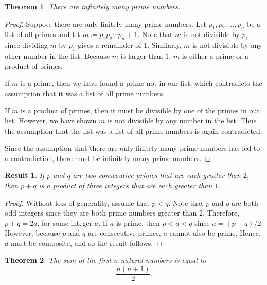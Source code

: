\documentclass[headings=standardclasses]{scrartcl}
\newtheorem{theorem}{Theorem}
\newtheorem{result}{Result}
\theoremstyle{definition}
\begin{document}
\begin{theorem}
  There are infinitely many prime numbers.
\end{theorem}

\begin{proof}
  Suppose there are only finitely many prime numbers. Let \(p_1, p_2, \ldots,
  p_n\) be a list of all primes and let \(m ≔ p_{1}p_{2} \cdots p_n + 1\). Note
  that \(m\) is not divisible by \(p_1\) since dividing \(m\) by \(p_1\) gives
  a remainder of \(1\). Similarly, \(m\) is not divisible by any other number
  in the list. Because \(m\) is larger than \(1\), \(m\) is either a prime or a
  product of primes.

  If \(m\) is a prime, then we have found a prime not in our list, which
  contradicts the assumption that it was a list of all prime numbers.

  If \(m\) is a product of primes, then it must be divisible by one of the
  primes in our list. However, we have shown \(m\) is not divisible by any
  number in the list. Thus the assumption that the list was a list of all prime
  numbers is again contradicted.

  Since the assumption that there are only finitely many prime numbers has led
  to a contradiction, there must be infinitely many prime numbers.
\end{proof}

\begin{result}
  If \(p\) and \(q\) are two consecutive primes that are each greater than
  \(2\), then \(p + q\) is a product of three integers that are each greater
  than \(1\).
\end{result}

\begin{proof}
  Without loss of generality, assume that \(p < q\). Note that \(p\) and \(q\)
  are both odd integers since they are both prime numbers greater than \(2\).
  Therefore, \(p + q = 2a\), for some integer \(a\). If \(a\) is prime, then
  \(p < a < q\) since \(a = (p + q)/2\). However, because \(p\) and \(q\) are
  consecutive primes, \(a\) cannot also be prime. Hence, \(a\) must be
  composite, and so the result follows.
\end{proof}

\begin{theorem}
  The sum of the first \(n\) natural numbers is equal to
  \[ \frac{n(n + 1)}{2}. \]
\end{theorem}
\end{document}
